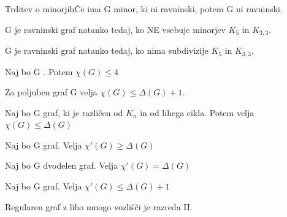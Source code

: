 \begin{slajd}
    {Trditev o minorjih}{Če ima G minor, ki ni ravninski, potem G ni ravninski.}
\end{slajd}

\begin{slajd}
    {}{G je ravninski graf natanko tedaj, ko NE vsebuje minorjev $K_5$ in $K_{3,3}$.}
\end{slajd}

\begin{slajd}
    {}{G je ravninski graf natanko tedaj, ko nima subdivizije $K_5$ in $K_{3,3}$.}
\end{slajd}

\begin{slajd}
    {}{Naj bo G . Potem $\chi(G)\leq 4$}
\end{slajd}

\begin{pagin}
    Za poljuben graf G velja $\chi(G)\leq \Delta(G)+1$.
\end{pagin}

\begin{slajd}
    {}{Naj bo G graf, ki je različen od $K_n$ in od lihega cikla. Potem velja $\chi(G)\leq \Delta(G)$}
\end{slajd}

\begin{pagin}
    {Naj bo G graf. Velja $\chi'(G) \geq \Delta(G)$}
\end{pagin}

\begin{slajd}
    {}{Naj bo G dvodelen graf. Velja $\chi'(G)= \Delta(G)$}
\end{slajd}

\begin{slajd}
    {}{Naj bo G graf. Velja $\chi'(G)\leq \Delta(G)+1$}
\end{slajd}

\begin{pagin}
    {Regularen graf z liho mnogo vozlišči je razreda II.}
\end{pagin}